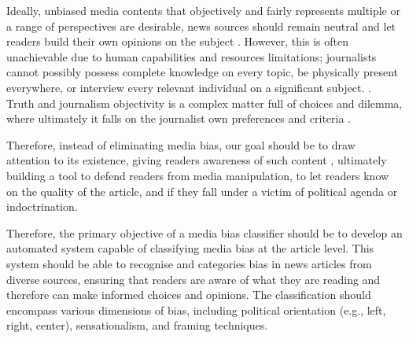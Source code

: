 Ideally, unbiased media contents that objectively and fairly represents multiple or a range of perspectives are desirable, news sources should remain neutral and let readers build their own opinions on the subject \cite{reuters-2021-digital-news-report}. However, this is often unachievable due to human capabilities and resources limitations; journalists cannot possibly possess complete knowledge on every topic, be physically present everywhere, or interview every relevant individual on a significant subject. \cite{allsides-2022-bias-definition}. Truth and journalism objectivity is a complex matter full of choices and dilemma, where ultimately it falls on the journalist own preferences and criteria \cite{boudana-2011-journalistic-objectivity}.

Therefore, instead of eliminating media bias, our goal should be to draw attention to its existence, giving readers awareness of such content \cite{spinde-2024-taxonomy}, ultimately building a tool to defend readers from media manipulation, to let readers know on the quality of the article, and if they fall under a victim of political agenda or indoctrination.

Therefore, the primary objective of a media bias classifier should be to develop an automated system capable of classifying media bias at the article level. This system should be able to recognise and categories bias in news articles from diverse sources, ensuring that readers are aware of what they are reading and therefore can make informed choices and opinions. The classification should encompass various dimensions of bias, including political orientation (e.g., left, right, center), sensationalism, and framing techniques.

